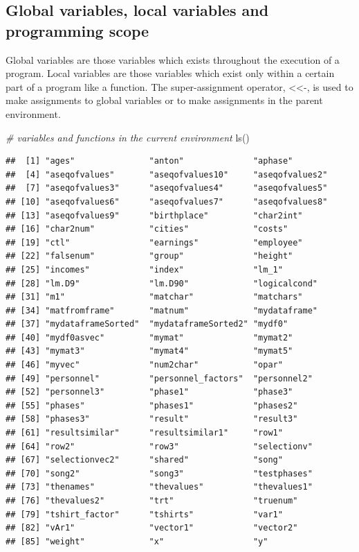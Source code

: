 \documentclass[
]{book}
\newenvironment{Shaded}{\begin{snugshade}}{\end{snugshade}}
\newcommand{\CommentTok}[1]{\textcolor[rgb]{0.56,0.35,0.01}{\textit{#1}}}
\newcommand{\FunctionTok}[1]{\textcolor[rgb]{0.00,0.00,0.00}{#1}}
\newcommand{\NormalTok}[1]{#1}
\begin{document}
\hypertarget{global-variables-local-variables-and-programming-scope}{%
\subsection{Global variables, local variables and programming scope}\label{global-variables-local-variables-and-programming-scope}}

Global variables are those variables which exists throughout the execution of a program. Local variables are those variables which exist only within a certain part of a program like a function. The super-assignment operator, \textless\textless-, is used to make assignments to global variables or to make assignments in the parent environment.

\begin{Shaded}
\begin{Highlighting}[]
\CommentTok{\# variables and functions in the current environment}
\FunctionTok{ls}\NormalTok{()}
\end{Highlighting}
\end{Shaded}

\begin{verbatim}
##  [1] "ages"               "anton"              "aphase"            
##  [4] "aseqofvalues"       "aseqofvalues10"     "aseqofvalues2"     
##  [7] "aseqofvalues3"      "aseqofvalues4"      "aseqofvalues5"     
## [10] "aseqofvalues6"      "aseqofvalues7"      "aseqofvalues8"     
## [13] "aseqofvalues9"      "birthplace"         "char2int"          
## [16] "char2num"           "cities"             "costs"             
## [19] "ctl"                "earnings"           "employee"          
## [22] "falsenum"           "group"              "height"            
## [25] "incomes"            "index"              "lm_1"              
## [28] "lm.D9"              "lm.D90"             "logicalcond"       
## [31] "m1"                 "matchar"            "matchars"          
## [34] "matfromframe"       "matnum"             "mydataframe"       
## [37] "mydataframeSorted"  "mydataframeSorted2" "mydf0"             
## [40] "mydf0asvec"         "mymat"              "mymat2"            
## [43] "mymat3"             "mymat4"             "mymat5"            
## [46] "myvec"              "num2char"           "opar"              
## [49] "personnel"          "personnel_factors"  "personnel2"        
## [52] "personnel3"         "phase1"             "phase3"            
## [55] "phases"             "phases1"            "phases2"           
## [58] "phases3"            "result"             "result3"           
## [61] "resultsimilar"      "resultsimilar1"     "row1"              
## [64] "row2"               "row3"               "selectionv"        
## [67] "selectionvec2"      "shared"             "song"              
## [70] "song2"              "song3"              "testphases"        
## [73] "thenames"           "thevalues"          "thevalues1"        
## [76] "thevalues2"         "trt"                "truenum"           
## [79] "tshirt_factor"      "tshirts"            "var1"              
## [82] "vAr1"               "vector1"            "vector2"           
## [85] "weight"             "x"                  "y"
\end{verbatim}
\end{document}
